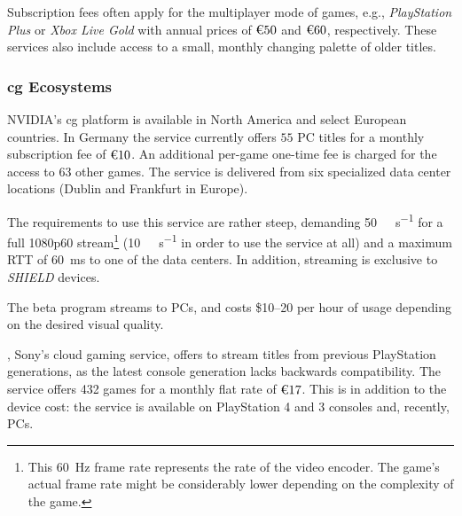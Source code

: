 Subscription fees often apply for the multiplayer mode of games, e.g.,
\textit{PlayStation Plus} or \textit{Xbox Live Gold} with annual prices
of $\text{\texteuro} 50$ and $\text{\texteuro} 60$, respectively. These
services also include access to a small, monthly changing palette of
older titles.




\subsubsection{\Gls{cg} Ecosystems}

NVIDIA's \gls{cg} platform%
\gfnow
is available in North America and select European countries.
In Germany the service currently offers $55$ PC titles
for a monthly subscription fee of $\text{\texteuro} 10$. An additional
per-game one-time fee
is charged for the access to $63$ other games.
The service is delivered from six
specialized data center locations (Dublin and Frankfurt in Europe).

The requirements to use this service are rather steep, demanding
\SI{50}{\mega\bit\per\second} for a full
1080p60 stream\footnote{\label{foot:rate}This
\SI{60}{\hertz} frame rate represents the rate of the video encoder.
The game's actual frame rate might be considerably lower depending on
the complexity of the game.} (\SI{10}{\mega\bit\per\second} in
order to use the service at all) and a maximum \acrshort{RTT} of
\SI{60}{\milli\second} to one of the data centers. In addition,
streaming is exclusive to \textit{SHIELD} devices.

The \gfnowpc beta program streams to \glspl{PC}, and costs
\$\SIrange{10}{20}{} per hour of usage depending on the desired
visual quality.


\psnow, Sony's cloud gaming service, offers to stream titles from previous
PlayStation generations, as the latest console generation lacks
backwards compatibility.
The service offers 432 games for a monthly flat rate of
$\text{\texteuro}17$.
This is in addition to
the device cost: the service is available on PlayStation 4 and 3
consoles and, recently, \glspl{PC}.

